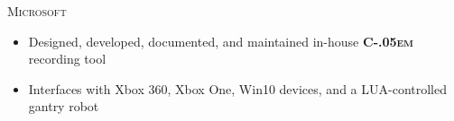 \documentclass[10pt,letterpaper,roman]{moderncv} %
\begin{document}
  {\textsc{Microsoft}}{}{}{
 \begin{itemize}
   \item Designed, developed, documented, and maintained in-house \textbf{\textsc{C\kern-.05em \resizebox{!}{\dimen0}{\raisebox{\depth}{\#}}}} recording tool
   \item Interfaces with Xbox 360, Xbox One, Win10 devices, and a LUA-controlled gantry robot
 \end{itemize}
 }
\end{document}
